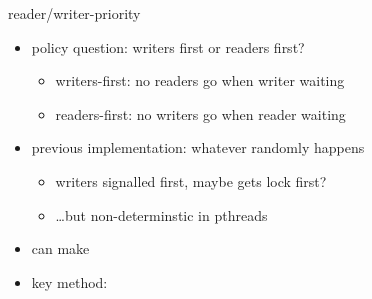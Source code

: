 
\begin{frame}{reader/writer-priority}
\begin{itemize}
\item policy question: writers first or readers first?
\begin{itemize}
    \item writers-first: no readers go when writer waiting
    \item readers-first: no writers go when reader waiting
\end{itemize}
\item previous implementation: whatever randomly happens
    \begin{itemize}
    \item writers signalled first, maybe gets lock first?
    \item \ldots but non-determinstic in pthreads
    \end{itemize}
\vspace{.5cm}
\item can make 
\item<2-> key method: 
\end{itemize}
\end{frame}


